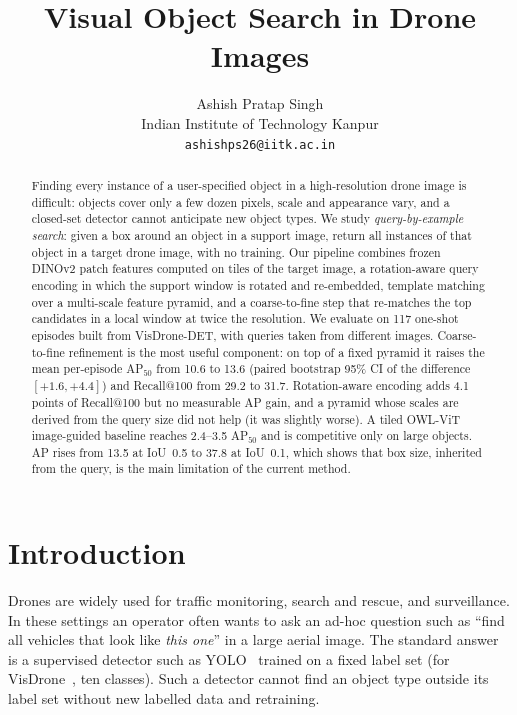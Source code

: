 \documentclass[10pt,twocolumn,letterpaper]{article}
\newcommand{\ap}{AP$_{50}$}
\begin{document}
\title{Visual Object Search in Drone Images}

\author{Ashish Pratap Singh \\
Indian Institute of Technology Kanpur\\
\texttt{ashishps26@iitk.ac.in}
}

\maketitle

\begin{abstract}
Finding every instance of a user-specified object in a high-resolution drone image is difficult: objects cover only a few dozen pixels, scale and appearance vary, and a closed-set detector cannot anticipate new object types. We study \emph{query-by-example search}: given a box around an object in a support image, return all instances of that object in a target drone image, with no training. Our pipeline combines frozen DINOv2 patch features computed on tiles of the target image, a rotation-aware query encoding in which the support window is rotated and re-embedded, template matching over a multi-scale feature pyramid, and a coarse-to-fine step that re-matches the top candidates in a local window at twice the resolution. We evaluate on 117 one-shot episodes built from VisDrone-DET, with queries taken from different images. Coarse-to-fine refinement is the most useful component: on top of a fixed pyramid it raises the mean per-episode \ap{} from 10.6 to 13.6 (paired bootstrap 95\% CI of the difference $[+1.6,+4.4]$) and Recall@100 from 29.2 to 31.7. Rotation-aware encoding adds 4.1 points of Recall@100 but no measurable AP gain, and a pyramid whose scales are derived from the query size did not help (it was slightly worse). A tiled OWL-ViT image-guided baseline reaches 2.4--3.5 \ap{} and is competitive only on large objects. AP rises from 13.5 at IoU~0.5 to 37.8 at IoU~0.1, which shows that box size, inherited from the query, is the main limitation of the current method.
\end{abstract}

\section{Introduction}
\label{sec:intro}

Drones are widely used for traffic monitoring, search and rescue, and surveillance. In these settings an operator often wants to ask an ad-hoc question such as ``find all vehicles that look like \emph{this one}'' in a large aerial image. The standard answer is a supervised detector such as YOLO~\cite{redmon2016yolo} trained on a fixed label set (for VisDrone~\cite{zhu2021visdrone}, ten classes). Such a detector cannot find an object type outside its label set without new labelled data and retraining.
\end{document}
